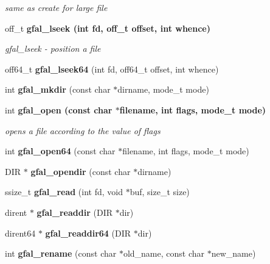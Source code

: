 \begin{CompactItemize}
\begin{CompactList}\small\item\em same as create for large file \item\end{CompactList}\item 
off\_\-t \bf{gfal\_\-lseek} (int fd, off\_\-t offset, int whence)
\begin{CompactList}\small\item\em gfal\_\-lseek - position a file \item\end{CompactList}\item 
off64\_\-t \textbf{gfal\_\-lseek64} (int fd, off64\_\-t offset, int whence)\label{group__posix__group_g39c7d0b6d366fdb0f218439ed3c3bb37}

\item 
int \textbf{gfal\_\-mkdir} (const char $\ast$dirname, mode\_\-t mode)\label{group__posix__group_g6f6affcf386900efc5443a9c97556a57}

\item 
int \bf{gfal\_\-open} (const char $\ast$filename, int flags, mode\_\-t mode)
\begin{CompactList}\small\item\em opens a file according to the value of flags \item\end{CompactList}\item 
int \textbf{gfal\_\-open64} (const char $\ast$filename, int flags, mode\_\-t mode)\label{group__posix__group_gbed417acea7f862ea1977417ed842ef4}

\item 
DIR $\ast$ \textbf{gfal\_\-opendir} (const char $\ast$dirname)\label{group__posix__group_g004ad5efbd544da820823e597e57be92}

\item 
ssize\_\-t \textbf{gfal\_\-read} (int fd, void $\ast$buf, size\_\-t size)\label{group__posix__group_gaa6bfe36f33b86e489b798aed96912de}

\item 
dirent $\ast$ \textbf{gfal\_\-readdir} (DIR $\ast$dir)\label{group__posix__group_g2a8ed205f7748d7817a18521268a1f2d}

\item 
dirent64 $\ast$ \textbf{gfal\_\-readdir64} (DIR $\ast$dir)\label{gfal__posix_8c_ad202b2730efde51021b620bce0d1683}

\item 
int \textbf{gfal\_\-rename} (const char $\ast$old\_\-name, const char $\ast$new\_\-name)\label{group__posix__group_g34dc6129530d6bf9e5836ef22c0d2792}


\end{CompactItemize}
